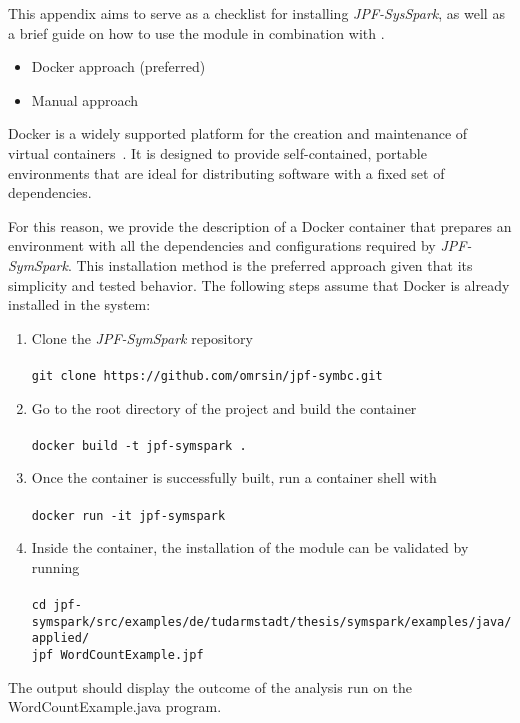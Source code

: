 \label{app:installation}

This appendix aims to serve as a checklist for installing \textit{JPF-SysSpark}, as well as a brief guide on how to use the module in combination with \jpf{}.
\begin{itemize}
	\item Docker approach (preferred)
	\item Manual approach
\end{itemize}


Docker is a widely supported platform for the creation and maintenance of virtual containers~\cite{Merkel2014}. It is designed to provide self-contained, portable environments that are ideal for distributing software with a fixed set of dependencies.

For this reason, we provide the description of a Docker container that prepares an environment with all the dependencies and configurations required by \textit{JPF-SymSpark}. This installation method is the preferred approach given that its simplicity and tested behavior. The following steps assume that Docker is already installed in the system:

\begin{enumerate}
	\item Clone the \textit{JPF-SymSpark} repository \\ \\	
		\lstinline[]|git clone https://github.com/omrsin/jpf-symbc.git|
	\item Go to the root directory of the project and build the container \\ \\
		\lstinline[]|docker build -t jpf-symspark .|
	\item Once the container is successfully built, run a container shell with \\ \\
		\lstinline[]|docker run -it jpf-symspark|
	\item Inside the container, the installation of the module can be validated by running \\ \\
		\lstinline[]|cd jpf-symspark/src/examples/de/tudarmstadt/thesis/symspark/examples/java/applied/| \\
		\lstinline[]|jpf WordCountExample.jpf|
\end{enumerate}

The output should display the outcome of the analysis run on the WordCountExample.java program.

